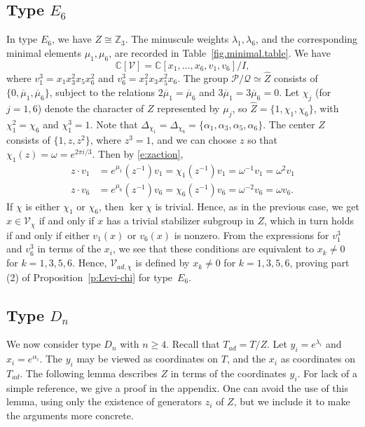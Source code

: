 \documentclass[reqno,11pt]{amsart}
\theoremstyle{remark}
\theoremstyle{remark}
\theoremstyle{definition}
\theoremstyle{definition}
\theoremstyle{definition}
\numberwithin{equation}{section}
\newcommand{\C}{\mathbb{C}}           %
\newcommand{\Z}{\mathbb{ Z}}           %
\renewcommand{\ker}{\operatorname{ker }}
\newcommand{\ga}{\alpha}
\newcommand{\cp}{\mathcal{P}}
\newcommand{\cq}{\mathcal{Q}}
\newcommand{\toric}{\mathcal{V}}
\renewcommand{\hat}{\widehat}
\begin{document}
\subsection{Type $E_6$}
In type $E_6$, we have $Z \cong \Z_3$.  The minuscule weights $\lambda_{1},\lambda_{6}$, and the corresponding minimal
elements $\mu_{1}, \mu_{6}$, are recorded in Table~\ref{fig.minimal.table}. 
We have 
\[
\C[\toric] = \C[x_1, \ldots, x_6, v_1, v_6]/I,
\] 
where  $v_1^3 =  x_1 x_3^2 x_5 x_6^2$ and $v_6^3 = x_1^2 x_3 x_5^2 x_6$.
The group $\cp/\cq\simeq \hat{Z}$ consists of $\{0, \overline{\mu}_1, \overline{\mu}_6 \}$, subject to the relations $2 \overline{\mu}_1 = \overline{\mu}_6$ and $3 \overline{\mu}_1 = 3\overline{\mu}_6=0$.
Let $\chi_j$ (for $j = 1,6$) denote the character of $Z$ represented by $\mu_j$, so $\hat{Z} = \{ 1, \chi_1, \chi_6 \}$, with
$\chi_1^2 = \chi_6$ and $\chi_1^3 = 1$. Note that $\Delta_{\chi_1} = \Delta_{\chi_6} = \{ \ga_1, \ga_3, \ga_5, \ga_6 \}$.
The center $Z$ consists of $\{1,z, z^2 \}$, where $z^3 = 1$, and we can choose $z$ so that $\chi_1(z) = \omega = e^{2 \pi i/3}$.  Then by \eqref{e:zaction},
\begin{align*}
z \cdot v_1 &= e^{\mu_1}(z^{-1}) v_1 = \chi_1(z^{-1})v_1 = \omega^{-1}v_1 = \omega^2 v_1 \\
z \cdot v_6 &= e^{\mu_6}(z^{-1})v_6 = \chi_6(z^{-1})v_6 = \omega^{-2}v_6 =  \omega v_6.
\end{align*} 
If $\chi$ is either $\chi_1$ or $\chi_6$, then $\ker \chi$ is trivial.  Hence, as in the previous case, we get $x\in \toric_\chi$ if and only if $x$ has a trivial stabilizer subgroup in $Z$, which in turn holds if and only if either $v_1(x)$ or $v_6(x)$ is nonzero.
From the expressions for $v_1^3$ and $v_6^3$ in terms of the $x_i$, we see that these conditions are equivalent to $x_k \neq 0$ for
$k = 1,3,5,6$.  Hence, $\toric_{ad, \chi}$ is defined by $x_k \neq 0$ for $k=1,3,5,6$, proving part (2) of Proposition~\ref{p:Levi-chi} for type~$E_6$.



\subsection{Type $D_n$} \label{ss:Dn}
We now consider type $D_n$ with $n\geq 4$.  Recall that $T_{ad} =  T/Z$.  Let $y_i=e^{\lambda_i}$ and $x_i=e^{\alpha_i}$.
The $y_i$ may be viewed as coordinates on $T$, and the $x_i$ as coordinates on $T_{ad}$.  The following lemma describes $Z$ in terms of the coordinates $y_i$.  For lack of a simple reference, we give a proof in the appendix.  One can avoid the use of this lemma, using only the existence of generators $z_i$ of $Z$, but we include it to make the arguments more concrete. 
\end{document}
